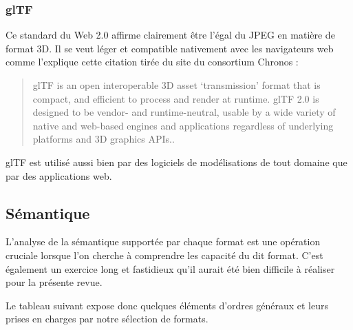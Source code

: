 \subsubsection{glTF}
Ce standard du Web 2.0 affirme clairement être l'égal du JPEG en matière de format 3D. Il se veut léger et compatible nativement avec les navigateurs web comme l'explique cette citation tirée du site du consortium Chronos :\cite{khronosGlTFRuntime}
\begin{quote}
   glTF is an open interoperable 3D asset ‘transmission’ format that is compact, and efficient to process and render at runtime. glTF 2.0 is designed to be vendor- and runtime-neutral, usable by a wide variety of native and web-based engines and applications regardless of underlying platforms and 3D graphics APIs.. \cite{GlTFSpecification2021}
\end{quote}    
glTF est utilisé aussi bien par des logiciels de modélisations de tout domaine que par des applications web.

\newpage

\subsection{Sémantique}
L'analyse de la sémantique supportée par chaque format est une opération cruciale lorsque l'on cherche à comprendre les capacité du dit format. C'est également un exercice long et fastidieux qu'il aurait été bien difficile à réaliser pour la présente revue. 

Le tableau suivant expose donc quelques éléments d'ordres généraux et leurs prises en charges par notre sélection de formats.

